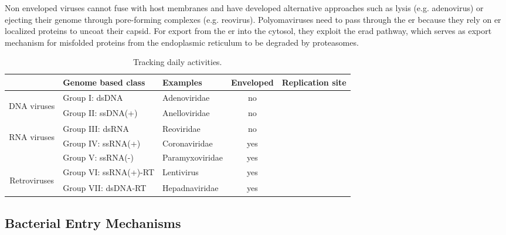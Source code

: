 
Non enveloped viruses cannot fuse with host membranes and have developed alternative approaches such as lysis (e.g. adenovirus) or ejecting their genome through pore-forming complexes (e.g. reovirus). Polyomaviruses need to pass through the \gls{er} because they rely on \gls{er} localized proteins to uncoat their capsid. For export from the \gls{er} into the cytosol, they exploit the \gls{erad} pathway, which serves as export mechanism for misfolded proteins from the endoplasmic reticulum to be degraded by proteasomes.

\begin{table}
  \label{tab:activityTracking}
  \centering
  \caption{Tracking daily activities.}
  \footnotesize
  \begin{tabular}[c]{c|l|l|c|c}
    & Genome based class & Examples & Enveloped & Replication site\\
    \hline \multirow{2}{*}{\begin{sideways}DNA viruses\end{sideways}} &   
    Group I: dsDNA &
    Adenoviridae &
    no &\\
    \cline{2-5} &
    Group II: ssDNA(+) &
    Anelloviridae &
    no &\\
    \hline \multirow{3}{*}{\begin{sideways}RNA viruses\end{sideways}} &   
    Group III: dsRNA &
    Reoviridae &
    no &\\
    \cline{2-5} &
    Group IV: ssRNA(+) &
    Coronaviridae &
    yes &\\
    \cline{2-5} &
    Group V: ssRNA(-) &
    Paramyxoviridae &
    yes &\\
    \hline \multirow{2}{*}{\begin{sideways}Retroviruses\end{sideways}} &   
    Group VI: ssRNA(+)-RT &
    Lentivirus &
    yes &\\
    \cline{2-5} &
    Group VII: dsDNA-RT &
    Hepadnaviridae &
    yes &
  \end{tabular}
\end{table}


\subsection{Bacterial Entry Mechanisms}

